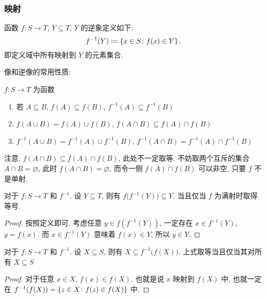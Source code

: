 \documentclass[UTF8]{ctexart}
\theoremstyle{mystyle}
\DeclarePairedDelimiter\set{\lbrace}{\rbrace}
\begin{document}
\subsubsection{映射}
\begin{definition}[\text{逆象}]
    函数 $ f \colon S \to T $, $ Y \subseteq T $, $ Y $ 的逆象定义如下: \[ f^{-1}(Y) \coloneqq \set{x \in S \colon f(x) \in Y} \,.\] 即定义域中所有映射到 $ Y $ 的元素集合.
\end{definition}

像和逆像的常用性质:
\begin{proposition}
    $ f \colon S \to T $ 为函数
    \begin{enumerate}
        \item 若 $ A \subseteq B $, $ f(A) \subseteq f(B) $, $ f^{-1}(A) \subseteq f^{-1}(B) $
        \item $ f(A \cup B) = f(A) \cup f(B) $, $ f(A \cap B) \subseteq f(A) \cap f(B) $
        \item $ f^{-1}(A \cup B) = f^{-1}(A) \cup f^{-1}(B) $, $ f^{-1}(A \cap B) = f^{-1}(A) \cap f^{-1}(B) $
    \end{enumerate}
\end{proposition}

注意, $ f(A \cap B) \subseteq f(A) \cap f(B) $, 此处不一定取等. 不妨取两个互斥的集合 $ A \cap B = \varnothing $, 此时 $ f(A \cap B) = \varnothing $, 而令一侧 $ f(A) \cap f(B) $ 可以非空, 只要 $ f $ 不是单射.

\begin{proposition}
    对于 $ f \colon S \to T $ 和 $ f^{-1} $. 设 $ Y \subseteq T $, 则有 $ f \big( f^{-1}(Y) \big) \subseteq Y $. 当且仅当 $ f $ 为满射时取得等号.
\end{proposition}

\begin{proof}
    按照定义即可. 考虑任意 $ y \in f( f^{-1}(Y) ) $, 一定存在 $ x \in f^{-1}(Y) $, $ y = f(x) $. 而 $ x \in f^{-1}(Y) $ 意味着 $ f(x) \in Y $, 所以 $ y \in Y $.
\end{proof}

\begin{proposition}
    对于 $ f \colon S \to T $ 和 $ f^{-1} $. 设 $ X \subseteq S $, 则有 $ X \subseteq f^{-1} \big( f (X) \big) $. 上式取等当且仅当其对所有 $ X \subseteq S $
\end{proposition}

\begin{proof}
    对于任意 $ x \in X $, $ f(x) \in f(X) $. 也就是说 $ x $ 映射到 $ f(X) $ 中, 也就一定在 $ f^{-1}(f(X)) = \set{z \in X \colon f(z) \in f(X)} $ 中.
\end{proof}
\end{document}
